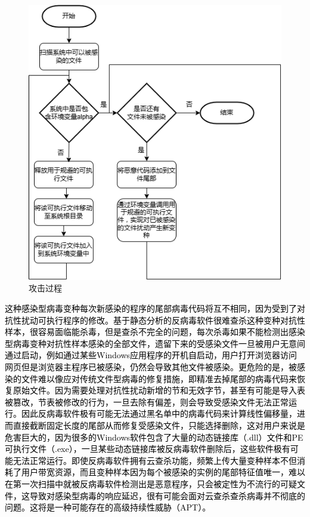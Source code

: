 \begin{figure}
  \centering
  \includegraphics[]{images/attack.png}
  \caption{攻击过程}\label{fig:attack}
\end{figure}
\textcolor{black}{这种感染型病毒变种每次新感染的程序的尾部病毒代码将互不相同，因为受到了对抗性扰动可执行程序的修改。基于静态分析的反病毒软件很难查杀这种变种对抗性样本，很容易面临能杀毒，但是查杀不完全的问题，每次杀毒如果不能检测出感染型病毒变种对抗性样本感染的全部文件，遗留下来的受感染文件一旦被用户无意间通过启动，例如通过某些Windows应用程序的开机自启动，用户打开浏览器访问网页但是浏览器主程序已被感染，仍然会导致其他文件被感染。更危险的是，被感染的文件难以像应对传统文件型病毒的修复措施，即精准去掉尾部的病毒代码来恢复原始文件。因为需要处理对抗性扰动新增的节和无效字节，甚至有可能是导入表被篡改，节表被修改的行为，一旦去除有偏差，则会导致受感染文件无法正常运行。因此反病毒软件极有可能无法通过黑名单中的病毒代码来计算线性偏移量，进而直接截断固定长度的尾部从而修复受感染文件，只能选择删除，这对用户来说是危害巨大的，因为很多的Windows软件包含了大量的动态链接库（.dll）文件和PE可执行文件（.exe），一旦某些动态链接库被反病毒软件删除后，这些软件极有可能无法正常运行。即使反病毒软件拥有云查杀功能，频繁上传大量变种样本不但消耗了用户带宽资源，而且变种样本因为每个被感染的实例的尾部特征值唯一，难以在第一次扫描中就被反病毒软件检测出是恶意程序，只会被定性为不流行的可疑文件，这导致对感染型病毒的响应延迟，很有可能会面对云查杀查杀病毒并不彻底的问题。这将是一种可能存在的高级持续性威胁（APT）。}

